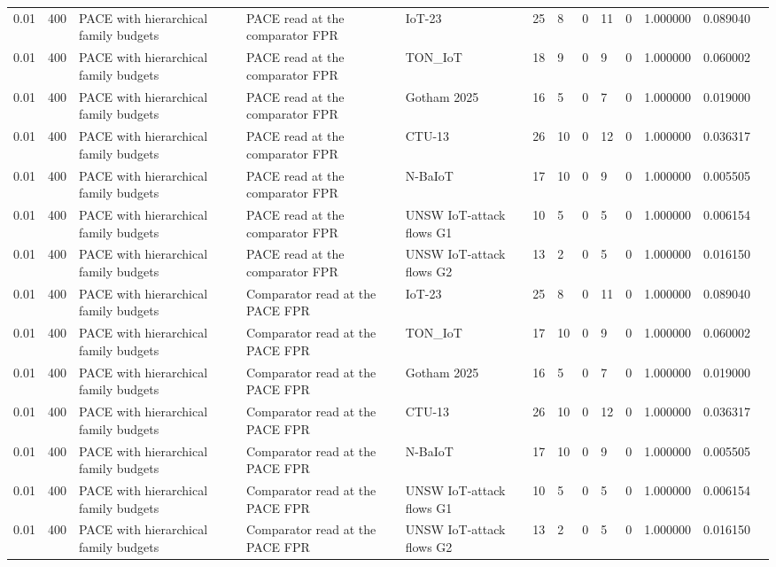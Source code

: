 \begin{tabular}{lllllllllllll}
0.01 & 400 & PACE with hierarchical family budgets & PACE read at the comparator FPR & IoT-23 & 25 & 8 & 0 & 11 & 0 & 1.000000 & 0.089040 &  \\
0.01 & 400 & PACE with hierarchical family budgets & PACE read at the comparator FPR & TON\_IoT & 18 & 9 & 0 & 9 & 0 & 1.000000 & 0.060002 &  \\
0.01 & 400 & PACE with hierarchical family budgets & PACE read at the comparator FPR & Gotham 2025 & 16 & 5 & 0 & 7 & 0 & 1.000000 & 0.019000 &  \\
0.01 & 400 & PACE with hierarchical family budgets & PACE read at the comparator FPR & CTU-13 & 26 & 10 & 0 & 12 & 0 & 1.000000 & 0.036317 &  \\
0.01 & 400 & PACE with hierarchical family budgets & PACE read at the comparator FPR & N-BaIoT & 17 & 10 & 0 & 9 & 0 & 1.000000 & 0.005505 &  \\
0.01 & 400 & PACE with hierarchical family budgets & PACE read at the comparator FPR & UNSW IoT-attack flows G1 & 10 & 5 & 0 & 5 & 0 & 1.000000 & 0.006154 &  \\
0.01 & 400 & PACE with hierarchical family budgets & PACE read at the comparator FPR & UNSW IoT-attack flows G2 & 13 & 2 & 0 & 5 & 0 & 1.000000 & 0.016150 &  \\
0.01 & 400 & PACE with hierarchical family budgets & Comparator read at the PACE FPR & IoT-23 & 25 & 8 & 0 & 11 & 0 & 1.000000 & 0.089040 &  \\
0.01 & 400 & PACE with hierarchical family budgets & Comparator read at the PACE FPR & TON\_IoT & 17 & 10 & 0 & 9 & 0 & 1.000000 & 0.060002 &  \\
0.01 & 400 & PACE with hierarchical family budgets & Comparator read at the PACE FPR & Gotham 2025 & 16 & 5 & 0 & 7 & 0 & 1.000000 & 0.019000 &  \\
0.01 & 400 & PACE with hierarchical family budgets & Comparator read at the PACE FPR & CTU-13 & 26 & 10 & 0 & 12 & 0 & 1.000000 & 0.036317 &  \\
0.01 & 400 & PACE with hierarchical family budgets & Comparator read at the PACE FPR & N-BaIoT & 17 & 10 & 0 & 9 & 0 & 1.000000 & 0.005505 &  \\
0.01 & 400 & PACE with hierarchical family budgets & Comparator read at the PACE FPR & UNSW IoT-attack flows G1 & 10 & 5 & 0 & 5 & 0 & 1.000000 & 0.006154 &  \\
0.01 & 400 & PACE with hierarchical family budgets & Comparator read at the PACE FPR & UNSW IoT-attack flows G2 & 13 & 2 & 0 & 5 & 0 & 1.000000 & 0.016150 &  \\

\end{tabular}
